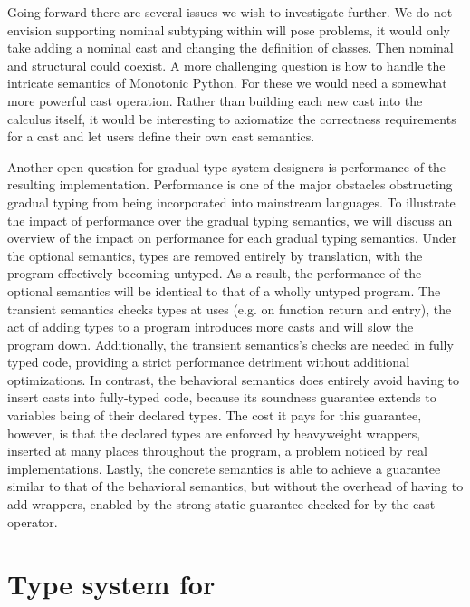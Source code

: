 \documentclass[a4paper,USenglish]{tex/lipics-v2016}
\begin{document}
Going forward there are several issues we wish to investigate further.  We
do not envision supporting nominal subtyping within \kafka will pose
problems, it would only take adding a nominal cast and changing the
definition of classes. Then nominal and structural could coexist. A more
challenging question is how to handle the intricate semantics of Monotonic
Python. For these we would need a somewhat more powerful cast operation.
Rather than building each new cast into the calculus itself, it would be
interesting to axiomatize the correctness requirements for a cast and let
users define their own cast semantics.

Another open question for gradual type system designers is performance of
the resulting implementation.  Performance is one of the major obstacles
obstructing gradual typing from being incorporated into mainstream
languages. To illustrate the impact of performance over the gradual typing
semantics, we will discuss an overview of the impact on performance for each
gradual typing semantics.  Under the optional semantics, types are removed
entirely by translation, with the program effectively becoming untyped. As a
result, the performance of the optional semantics will be identical to that
of a wholly untyped program.  The transient semantics checks types at uses
(e.g. on function return and entry), the act of adding types to a program
introduces more casts and will slow the program down. Additionally, the
transient semantics's checks are needed in fully typed code, providing a
strict performance detriment without additional optimizations.  In contrast,
the behavioral semantics does entirely avoid having to insert casts into
fully-typed code, because its soundness guarantee extends to variables being
of their declared types. The cost it pays for this guarantee, however, is
that the declared types are enforced by heavyweight wrappers, inserted at
many places throughout the program, a problem noticed by real
implementations.  Lastly, the concrete semantics is able to achieve a
guarantee similar to that of the behavioral semantics, but without the
overhead of having to add wrappers, enabled by the strong static guarantee
checked for by the cast operator.



\newpage
\appendix
\section{Type system for \kafka}%
\label{appendix:kafka}
\end{document}
